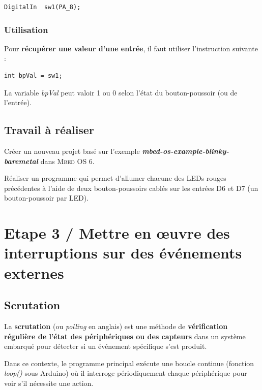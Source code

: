 \documentclass[a4paper,11pt,titlepage]{article} %
\begin{document}
\begin{lstlisting}
DigitalIn  sw1(PA_8);
\end{lstlisting}

\subsubsection{Utilisation}

Pour \textbf{récupérer une valeur d'une entrée}, il faut utiliser l'instruction suivante :

\begin{lstlisting}
int bpVal = sw1;
\end{lstlisting}

La variable \textsl{bpVal} peut valoir \textsc{1} ou \textsc{0} selon l'état du bouton-poussoir (ou de l'entrée).

\subsection{Travail à réaliser}

\Manip Créer un nouveau projet basé sur l'exemple \textbf{\textsl{mbed-os-example-blinky-baremetal}} dans \textsc{Mbed OS 6}.

\Manip Réaliser un programme qui permet d'allumer chacune des LEDs rouges précédentes à l'aide de deux bouton-poussoirs cablés sur les entrées D6 et D7 (un bouton-poussoir par LED).


\newpage
\section{Etape 3 / Mettre en \oe{}uvre des interruptions sur des événements externes}

\subsection{Scrutation}

La \textbf{scrutation} (ou \textit{polling} en anglais) est une méthode de \textbf{vérification régulière de l'état des périphériques ou des capteurs} dans un système embarqué pour détecter si un événement spécifique s'est produit. 

Dans ce contexte, le programme principal exécute une boucle continue (fonction \textsl{loop()} sous Arduino) où il interroge périodiquement chaque périphérique pour voir s'il nécessite une action. 
\end{document}

